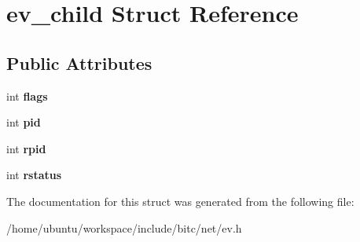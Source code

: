 \hypertarget{structev__child}{\section{ev\-\_\-child Struct Reference}
\label{structev__child}
}
\subsection*{Public Attributes}
\begin{DoxyCompactItemize}
\item 
\hypertarget{structev__child_adc0be0861d839044ff2791879d23b9da}{int {\bfseries flags}}\label{structev__child_adc0be0861d839044ff2791879d23b9da}

\item 
\hypertarget{structev__child_aabe34b18e3fd1e6ad14a24e5c0e5ba13}{int {\bfseries pid}}\label{structev__child_aabe34b18e3fd1e6ad14a24e5c0e5ba13}

\item 
\hypertarget{structev__child_affe3dced46abf3638cf24b576c07c955}{int {\bfseries rpid}}\label{structev__child_affe3dced46abf3638cf24b576c07c955}

\item 
\hypertarget{structev__child_aac9c76006b1e0139dabae9a13775e775}{int {\bfseries rstatus}}\label{structev__child_aac9c76006b1e0139dabae9a13775e775}

\end{DoxyCompactItemize}


The documentation for this struct was generated from the following file\-:\begin{DoxyCompactItemize}
\item 
/home/ubuntu/workspace/include/bitc/net/ev.\-h\end{DoxyCompactItemize}
